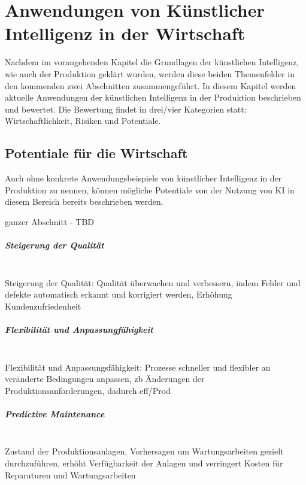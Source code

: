 \documentclass[a4paper,12pt, german]{report}
\begin{document}
\chapter{Anwendungen von Künstlicher Intelligenz in der Wirtschaft}

Nachdem im vorangehenden Kapitel die Grundlagen der künstlichen Intelligenz, wie auch der Produktion geklärt wurden, werden diese beiden Themenfelder in den kommenden zwei Abschnitten zusammengeführt. In diesem Kapitel werden aktuelle Anwendungen der künstlichen Intelligenz in der Produktion beschrieben und bewertet. Die Bewertung findet in drei/vier Kategorien statt: Wirtschaftlichkeit, Risiken und Potentiale.

\section{Potentiale für die Wirtschaft}
Auch ohne konkrete Anwendungsbeispiele von künstlicher Intelligenz in der Produktion zu nennen, können mögliche Potentiale von der Nutzung von KI in diesem Bereich bereits beschrieben werden.

ganzer Abschnitt - TBD 

\paragraph{Steigerung der Qualität} $ $ \\ 
Steigerung der Qualität: Qualität überwachen und verbessern, indem Fehler und defekte automatisch erkannt und korrigiert werden, Erhöhung Kundenzufriedenheit

\paragraph{Flexibilität und Anpassungfähigkeit} $ $ \\ 
Flexibilität und Anpassungsfähigkeit: Prozesse schneller und flexibler an veränderte Bedingungen anpassen, zb Änderungen der Produktionsanforderungen, dadurch eff/Prod

\paragraph{Predictive Maintenance} $ $ \\ 
Zustand der Produktionsanlagen, Vorhersagen um Wartungsarbeiten gezielt durchzuführen, erhöht Verfügbarkeit der Anlagen und verringert Kosten für Reparaturen und Wartungsarbeiten
\end{document}
